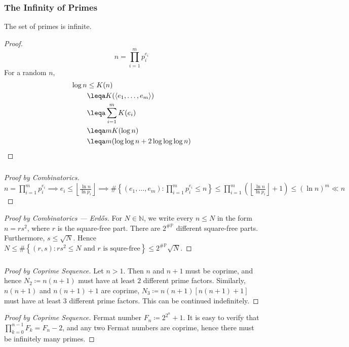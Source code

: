 \documentclass[UTF8,11pt,colorlinks,compress,openany]{beamer}%
\begin{document}
\begin{frame}\frametitle{The Infinity of Primes}
\setlength\abovedisplayskip{0pt}
\setlength\belowdisplayskip{0pt}
	\vspace*{-.15\textheight}
	\begin{theorem}
		The set of primes is infinite.
	\end{theorem}
	\vspace*{-.01\textheight}
	\begin{proof}
		\[n=\prod\limits_{i=1}^m p_i^{e_i}\]
		For a random $n$,
		\begin{align*}
		\log n &\leq K(n)\\
		&\leqa K(\langle e_1,\ldots,e_m\rangle)\\
		&\leqa\sum\limits_{i=1}^m K(e_i)\\
		&\leqa mK(\log n)\\
		&\leqa m(\log\log n+2\log\log\log n)
		\end{align*}
	\end{proof}\vspace*{-.49\textwidth}
\end{frame}

\begin{frame}\frametitle{}
\begin{proof}[Proof by Combinatorics]
	$n=\prod\limits_{i=1}^m p_i^{e_i}\implies e_i\leq\left\lfloor\frac{\ln n}{\ln p_i}\right\rfloor\implies\#\left\{(e_1,\dots,e_m): \prod\limits_{i=1}^m p_i^{e_i}\leq n\right\}\leq \prod\limits_{i=1}^m\left(\left\lfloor\frac{\ln n}{\ln p_i}\right\rfloor+1\right)\leq (\ln n)^m\ll n$
\end{proof}
\begin{proof}[Proof by Combinatorics --- Erd\H{o}s]
For $N\in\mathbb{N}$, we write every $n\leq N$ in the form $n=rs^2$, where $r$ is the square-free part. There are $2^{\#\mathbb{P}}$ different square-free parts. Furthermore, $s\leq\sqrt{N}$. Hence $N\leq\#\left\{(r,s): rs^2\leq N \mbox{ and $r$ is squre-free}\right\}\leq 2^{\#\mathbb{P}}\sqrt{N}$.
\end{proof}
\end{frame}

\begin{frame}\frametitle{}
\begin{proof}[Proof by Coprime Sequence]
Let $n>1$. Then $n$ and $n+1$ must be coprime, and hence $N_2\coloneqq n(n + 1)$ must have at least $2$ different prime factors. Similarly, $n(n+1)$ and $n(n+1)+1$ are coprime, $N_3\coloneqq n(n + 1)[n(n + 1) + 1]$ must have at least $3$ different prime factors. This can be continued indefinitely.
\end{proof}
\begin{proof}[Proof by Coprime Sequence]
Fermat number $F_n\coloneqq 2^{2^n}+1$. It is easy to verify that $\prod\limits_{k=0}^{n-1}F_k=F_n-2$, and any two Fermat numbers are coprime, hence there must be infinitely many primes.
\end{proof}
\end{frame}
\end{document}
